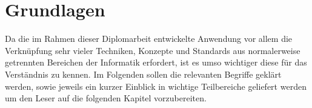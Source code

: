 \chapter{Grundlagen}

Da die im Rahmen dieser Diplomarbeit entwickelte Anwendung vor allem die  Verknüpfung sehr vieler
Techniken, Konzepte und Standards aus normalerweise  getrennten Bereichen der Informatik erfordert,
ist es umso wichtiger diese für  das Verständnis zu kennen. Im Folgenden sollen die relevanten
Begriffe geklärt werden, sowie jeweils ein kurzer Einblick in wichtige Teilbereiche geliefert werden
um den Leser auf die folgenden Kapitel vorzubereiten.





